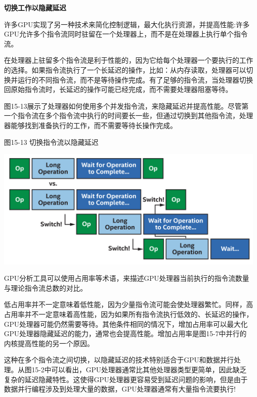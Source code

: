 \hspace*{\fill} \par %
\textbf{切换工作以隐藏延迟}

许多GPU实现了另一种技术来简化控制逻辑，最大化执行资源，并提高性能:许多GPU允许多个指令流同时驻留在一个处理器上，而不是在处理器上执行单个指令流。\par

在处理器上驻留多个指令流是利于性能的，因为它给每个处理器一个要执行的工作的选择。如果指令流执行了一个长延迟的操作，比如：从内存读取，处理器可以切换并运行的不同指令流，而不是等待操作完成。有了足够的指令流，当处理器切换回原始指令流时，长延迟的操作可能已经完成，而不需要处理器阻塞等待。\par

图15-13展示了处理器如何使用多个并发指令流，来隐藏延迟并提高性能。尽管第一个指令流在多个指令流中执行的时间要长一些，但通过切换到其他指令流，处理器能够找到准备执行的工作，而不需要等待长操作完成。\par

\hspace*{\fill} \par %
图15-13 切换指令流以隐藏延迟
\begin{center}
	\includegraphics[width=1.0\textwidth]{content/chapter-15/images/9}
\end{center}

GPU分析工具可以使用占用率等术语，来描述GPU处理器当前执行的指令流数量与理论指令流总数的对比。\par

低占用率并不一定意味着低性能，因为少量指令流可能会使处理器繁忙。同样，高占用率并不一定意味着高性能，因为如果所有指令流执行低效的、长延迟的操作，GPU处理器可能仍然需要等待。其他条件相同的情况下，增加占用率可以最大化GPU处理器隐藏延迟的能力，通常也会提高性能。增加占用率是图15-7中并行的内核提高性能的另一个原因。\par

这种在多个指令流之间切换，以隐藏延迟的技术特别适合于GPU和数据并行处理。从图15-2中可以看出，GPU处理器通常比其他处理器类型更简单，因此缺乏复杂的延迟隐藏特性。这使得GPU处理器更容易受到延迟问题的影响，但是由于数据并行编程涉及到处理大量的数据，GPU处理器通常有大量指令流要执行!\par














